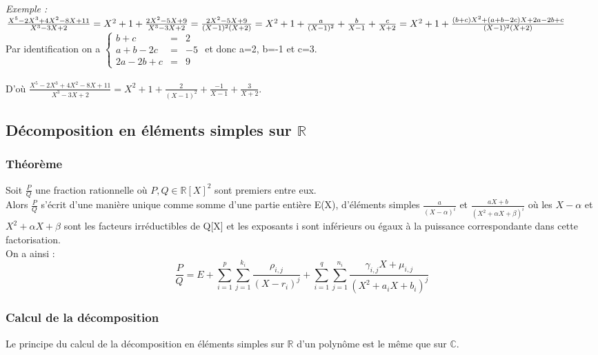 \documentclass[a4paper,10pt]{book} %
\newcommand{\R}{\mathbb{R}}
\newcommand{\C}{\mathbb{C}}
\begin{document}
\emph{Exemple :}\\

$\frac{X^{5}-2X^{3}+4X^{2}-8X+11}{X^{3}-3X+2}=X^{2}+1+\frac{2X^{2}-5X+9}{X^{3}-3X+2}=\frac{2X^{2}-5X+9}{(X-1)^{2}(X+2)}\\
=X^{2}+1+\frac{a}{(X-1)^{2}}+\frac{b}{X-1}+\frac{c}{X+2}=X^{2}+1+\frac{(b+c)X^{2}+(a+b-2c)X+2a-2b+c}{(X-1)^{2}(X+2)}$\\

Par identification on a $\left\{\begin{array}{rcl}
b+c&=&2\\
a+b-2c&=&-5\\
2a-2b+c&=&9
\end{array} \right.$ et donc a=2, b=-1 et c=3.\\\\

D'où $\frac{X^{5}-2X^{3}+4X^{2}-8X+11}{X^{3}-3X+2}=X^{2}+1+\frac{2}{(X-1)^{2}}+\frac{-1}{X-1}+\frac{3}{X+2}$.

\subsection{Décomposition en éléments simples sur $\R$}
\subsubsection{Théorème}
Soit $\frac{P}{Q}$ une fraction rationnelle où $P,Q \in \R[X]^{2}$ sont premiers entre eux.\\

Alors $\frac{P}{Q}$ s'écrit d'une manière unique comme somme d'une partie entière E(X), d'éléments simples $\frac{a}{(X-\alpha)^{i}}$ et $\frac{aX+b}{(X^{2}+\alpha X+\beta)^{i}}$ où les $X-\alpha$ et $X^{2}+\alpha X+\beta$ sont les facteurs irréductibles de Q[X] et les exposants i sont inférieurs ou égaux à la puissance correspondante dans cette factorisation.\\

On a ainsi : $$\frac{P}{Q}=E+\sum\limits_{i=1}^p\sum\limits_{j=1}^{k_i}
\frac{\rho_{i,j}}{(X-r_i)^j}+\sum\limits_{i=1}^{q}\sum\limits_{j=1}^{n_i} \frac{\gamma_{i,j}X+\mu_{i,j}}{(X^2+a_iX+b_i)^j}$$

\subsubsection{Calcul de la décomposition}
Le principe du calcul de la décomposition en éléments simples sur $\R$ d'un polynôme est le même que sur $\C$.
\end{document}
